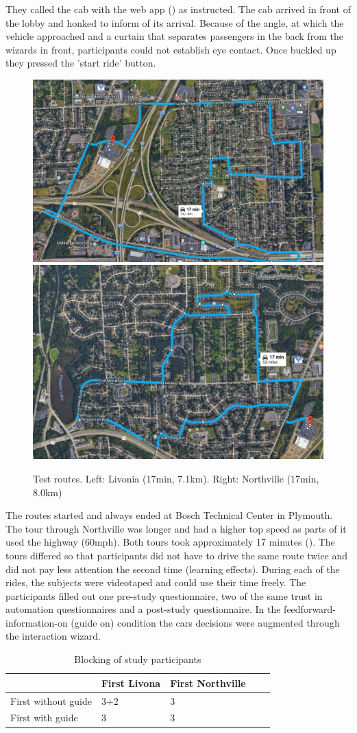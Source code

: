 They called the cab with the web app (\emph{}) as instructed. The cab arrived in front of the lobby and honked to inform of its arrival. Because of the angle, at which the vehicle approached and a curtain that separates passengers in the back from the wizards in front, participants could not establish eye contact. Once buckled up they pressed the 'start ride' button. 
\begin{figure}
     \includegraphics[height=0.31\textwidth]{fig/RouteA_Mittel.JPG}\hfill\includegraphics[height=0.31\textwidth]{fig/RouteB_Mittel.JPG}
    \caption[Test routes]{Test routes. Left: Livonia (17min, 7.1km). Right: Northville (17min, 8.0km)}
    \label{fig:routes}
\end{figure}
The routes started and always ended at Bosch Technical Center in Plymouth. The tour through Northville was longer and had a higher top speed as parts of it used the highway (60mph). Both tours took approximately 17 minutes (\emph{}). The tours differed so that participants did not have to drive the same route twice and did not pay less attention the second time (learning effects). 
During each of the rides, the subjects were videotaped and could use their time freely. The participants filled out one pre-study questionnaire, two of the same trust in automation questionnaires \citep{Jian2010,Koo2015} and a post-study questionnaire. In the feedforward-information-on (guide on) condition the cars decisions were augmented through the interaction wizard.

\begin{table}[]
  \caption{Blocking of study participants}
  \label{tab:blocking}

\begin{tabular}{@{}l|llll@{}}
\toprule
                    & First Livona & First Northville &  &  \\ \midrule
First without guide & 3+2          & 3                &  &  \\
First with guide    & 3            & 3                &  & 
\end{tabular}
\end{table}

